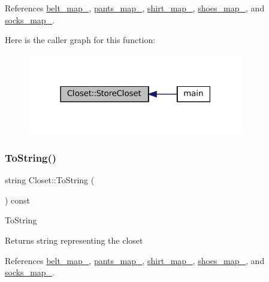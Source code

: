 References \mbox{\hyperlink{classCloset_a0631fe46e3c955109a613e1cd1d2cb52}{belt\+\_\+map\+\_\+}}, \mbox{\hyperlink{classCloset_a8be78859dfab9e2aa09bfbbb8f191dab}{pants\+\_\+map\+\_\+}}, \mbox{\hyperlink{classCloset_a8126a023a2777b84b23436da8d1f4b35}{shirt\+\_\+map\+\_\+}}, \mbox{\hyperlink{classCloset_ab1e1ce9110a044c90244407f0f6f92c4}{shoes\+\_\+map\+\_\+}}, and \mbox{\hyperlink{classCloset_a33a48dfc5ef542261bb0dd373f899f9e}{socks\+\_\+map\+\_\+}}.

Here is the caller graph for this function\+:
\nopagebreak
\begin{figure}[H]
\begin{center}
\leavevmode
\includegraphics[width=267pt]{classCloset_a1f2ec8e3e912756e35fdc55c9401ea3e_icgraph}
\end{center}
\end{figure}
\mbox{\label{classCloset_a3bad65dd75ada9a484eb7f78ebfa3b2a}} 
\subsubsection{\texorpdfstring{To\+String()}{ToString()}}
{\footnotesize\ttfamily string Closet\+::\+To\+String (\begin{DoxyParamCaption}{ }\end{DoxyParamCaption}) const}

To\+String \begin{DoxyReturn}{Returns}
\textquotesingle{}string\textquotesingle{} representing the closet 
\end{DoxyReturn}


References \mbox{\hyperlink{classCloset_a0631fe46e3c955109a613e1cd1d2cb52}{belt\+\_\+map\+\_\+}}, \mbox{\hyperlink{classCloset_a8be78859dfab9e2aa09bfbbb8f191dab}{pants\+\_\+map\+\_\+}}, \mbox{\hyperlink{classCloset_a8126a023a2777b84b23436da8d1f4b35}{shirt\+\_\+map\+\_\+}}, \mbox{\hyperlink{classCloset_ab1e1ce9110a044c90244407f0f6f92c4}{shoes\+\_\+map\+\_\+}}, and \mbox{\hyperlink{classCloset_a33a48dfc5ef542261bb0dd373f899f9e}{socks\+\_\+map\+\_\+}}.

